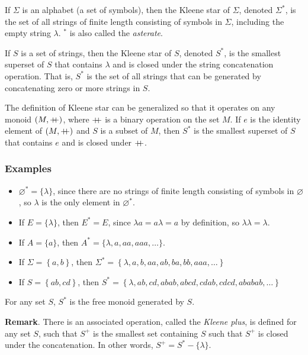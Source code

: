 \documentclass[12pt]{article}
\begin{document}
If $\Sigma$ is an alphabet (a set of symbols), then the Kleene star of $\Sigma$, denoted $\Sigma^*$, is the set of all strings of finite length consisting of symbols in $\Sigma$, including the empty string $\lambda$.  $^*$ is also called the \emph{asterate}.

If $S$ is a set of strings, then the Kleene star of $S$,
denoted $S^*$, is the smallest superset of $S$ that contains $\lambda$ and
is closed under the string concatenation operation.  That is, $S^*$ is the
set of all strings that can be generated by concatenating zero or more strings in $S$.

\newcommand{\concat}{\ensuremath{+\hspace{-1ex}+}}

The definition of Kleene star can be generalized so that it operates on any
monoid $(M, \concat)$, where $\concat$ is a binary operation on the set $M$.
If $e$ is the identity element of $(M, \concat)$
and $S$ is a subset of $M$, then $S^*$ is the smallest superset of $S$ that
contains $e$ and is closed under $\concat$.

\subsubsection*{Examples}
\begin{itemize}
\item $\varnothing^*=\lbrace \lambda \rbrace$, since there are no strings of finite length consisting of symbols in $\varnothing$, so $\lambda$ is the only element in $\varnothing^*$.
\item If $E=\lbrace \lambda \rbrace$, then $E^*=E$, since $\lambda a=a\lambda=a$ by definition, so $\lambda\lambda=\lambda$.
\item If $A=\lbrace a\rbrace$, then $A^*=\lbrace \lambda, a, aa, aaa, \ldots \rbrace$.
\item If $\Sigma = \left\{ a, b \right\}$, then $\Sigma^* = \left\{ \lambda, a, b, aa, ab, ba, bb, aaa, \dots \right\}$
\item If $S = \left\{ ab, cd \right\}$, then $S^* = \left\{ \lambda, ab, cd, abab, abcd, cdab, cdcd, ababab, \dots \right\}$
\end{itemize}

For any set $S$, $S^*$ is the free monoid generated by $S$.

\textbf{Remark}.  There is an associated operation, called the \emph{Kleene plus}, is defined for any set $S$, such that $S^+$ is the smallest set containing $S$ such that $S^+$ is closed under the concatenation.  In other words, $S^+=S^*-\lbrace \lambda\rbrace$.
\end{document}
